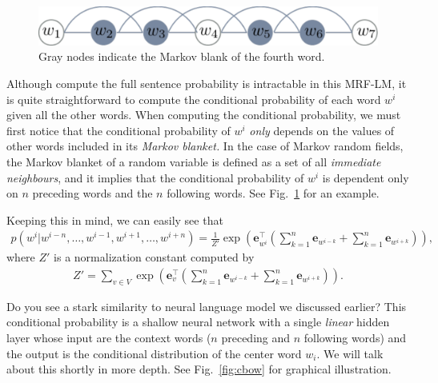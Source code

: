 \documentclass{report}
\newcommand{\vect}[1]{\mathbf{#1}}
\newcommand{\ve}[0]{\vect{e}}
\begin{document}
\begin{figure}[ht]
    \centering
    \includegraphics[width=\textwidth]{figures/mrflm_mblanket.pdf}
    \caption{Gray nodes indicate the Markov blank of the fourth word.}
    \label{fig:mrf_lm_mblanket}
\end{figure}

Although compute the full sentence probability is intractable in this MRF-LM, it
is quite straightforward to compute the conditional probability of each word
$w^i$ given all the other words. When computing the conditional probability, we
must first notice that the conditional probability of $w^i$ {\em only} depends
on the values of other words included in its {\em Markov blanket.} In the case
of Markov random fields, the Markov blanket of a random variable is defined as a
set of all {\em immediate neighbours}, and it implies that the conditional
probability of $w^i$ is dependent only on $n$ preceding words and the $n$
following words. See Fig.~\ref{fig:mrf_lm_mblanket} for an example.

Keeping this in mind, we can easily see that
\begin{align*}
    p(w^i|w^{i-n}, \ldots, w^{i-1}, w^{i+1}, \ldots, w^{i+n})
    = \frac{1}{Z'} \exp\left(\ve_{w^i}^\top \left( 
            \sum_{k=1}^n 
            \ve_{w^{i-k}}
            +
            \sum_{k=1}^n 
            \ve_{w^{i+k}}
    \right)\right),
\end{align*}
where $Z'$ is a normalization constant computed by
\begin{align*}
    Z' = \sum_{v \in V} \exp\left( \ve_v^\top \left( 
            \sum_{k=1}^n 
            \ve_{w^{i-k}}
            +
            \sum_{k=1}^n 
            \ve_{w^{i+k}}
    \right)\right).
\end{align*}

Do you see a stark similarity to neural language model we discussed earlier?
This conditional probability is a shallow neural network with a single {\em
linear} hidden layer whose input are the context words ($n$ preceding and $n$
following words) and the output is the conditional distribution of the center
word $w_i$. We will talk about this shortly in more depth. See
Fig.~\ref{fig:cbow} for graphical illustration.
\end{document}
